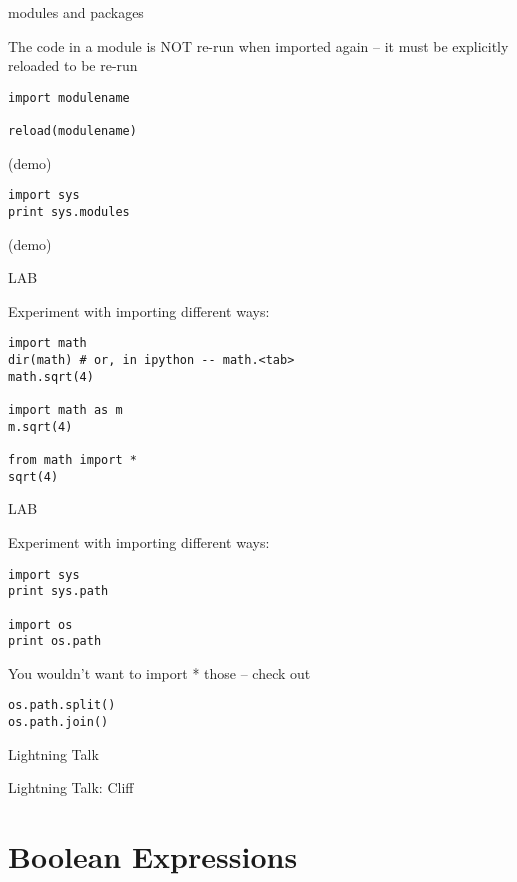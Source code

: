 \documentclass{beamer}
\begin{document}
\begin{frame}[fragile]{modules and packages}

\vfill
{\Large The code in a module is NOT re-run when imported again
 -- it must be explicitly reloaded to be re-run}

\begin{verbatim}
import modulename

reload(modulename)
\end{verbatim}

(demo)

\begin{verbatim}
import sys
print sys.modules
\end{verbatim}
(demo)
\end{frame}


\begin{frame}[fragile]{LAB}

{\Large  Experiment with importing different ways:}
\begin{verbatim}
import math
dir(math) # or, in ipython -- math.<tab>
math.sqrt(4)

import math as m
m.sqrt(4)

from math import *
sqrt(4)
\end{verbatim}

\end{frame}

\begin{frame}[fragile]{LAB}

{\Large  Experiment with importing different ways:}
\begin{verbatim}
import sys
print sys.path

import os
print os.path
\end{verbatim}
{\Large You wouldn't want to import * those -- check out}
\begin{verbatim}
os.path.split()
os.path.join()
\end{verbatim}

\end{frame}

\begin{frame}{Lightning Talk}

{\LARGE Lightning Talk: Cliff  }
\end{frame}


\section{Boolean Expressions}
\end{document}

